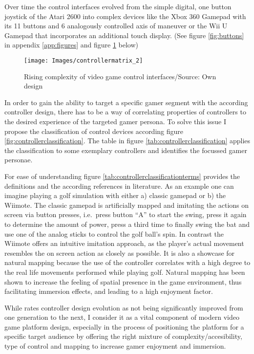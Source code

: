 \documentclass
[
    a4paper,
    11pt
]
{article}
\begin{document}
Over time the control interfaces evolved from the simple digital, one
button joystick of the Atari 2600 into complex devices like the Xbox 360
Gamepad with its 11 buttons and 6 analogously controlled axis of
maneuver or the Wii U Gamepad that incorporates an additional touch display.
(See figure \ref{fig:buttons} in appendix \ref{app:figures} and figure
\ref{fig:controllermatrix} below) \cite{Brunner2013}
%
\begin{figure}[ht!]
\centering
    \texttt{[image: Images/controllermatrix\_2]}
    \caption{Rising complexity of video game control interfaces/Source: Own design}
    \label{fig:controllermatrix}
\end{figure}
%
In order to gain the ability to target a specific gamer segment with the
according controller design, there has to be a way of correlating
properties of controllers to the desired experience of the targeted
gamer persona. To solve this issue I propose the classification of
control devices according figure \ref{fig:controllerclassification}. The
table in figure \ref{tab:controllerclassification} applies the
classification to some exemplary controllers and identifies the focussed
gamer personae.

For ease of understanding figure \ref{tab:controllerclassificationterms}
provides the definitions and the according references in literature. As
an example one can imagine playing a golf simulation with either
a) classic gamepad or b) the Wiimote. The classic gamepad is
artificially mapped and imitating the actions on screen via button
presses, i.e.~press button ``A'' to start the swing, press it again to
determine the amount of power, press a third time to finally swing the
bat and use one of the analog sticks to control the golf ball's spin. In
contrast the Wiimote offers an intuitive imitation approach, as the player's actual movement
resembles the on screen action as closely as possible. It is also a
showcase for natural mapping because the use of the controller
 correlates with a high degree to the real life movements
performed while playing golf. Natural mapping has been shown to increase
the feeling of spatial presence in the game environment, thus
facilitating immersion effects, and leading to a high enjoyment factor.
\cite{McGloin2011}

While \cite{Kelechava2015} rates controller design evolution as not
being significantly improved from one generation to the next, I consider
it as a vital component of modern video game platform design,
especially in the process of positioning the platform for a specific
target audience by offering the right mixture of
complexity/accesibility, type of control and mapping to increase gamer
enjoyment and immersion.
\end{document}
